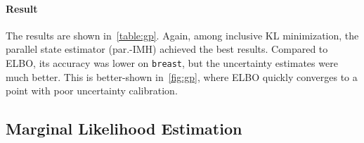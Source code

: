 \paragraph{Result}
The results are shown in~\cref{table:gp}.
Again, among inclusive KL minimization, the parallel state estimator (par.-IMH) achieved the best results.
Compared to ELBO, its accuracy was lower on \texttt{breast}, but the uncertainty estimates were much better.
This is better-shown in~\cref{fig:gp}, where ELBO quickly converges to a point with poor uncertainty calibration.

  \vspace{-0.05in}
\subsection{Marginal Likelihood Estimation}\label{section:mll}
  \vspace{-0.05in}
